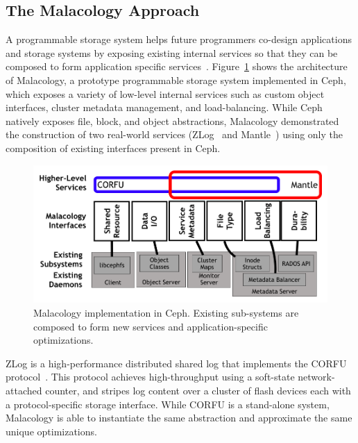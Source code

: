 \subsection{The Malacology Approach}


A programmable storage system helps future programmers co-design applications
and storage systems by exposing existing internal services so that 
they can be composed to form application specific
services~\cite{sevilla:eurosys17}.
Figure~\ref{fig:malacology} shows the architecture of Malacology, a prototype programmable storage system
implemented in Ceph, which exposes a variety of low-level internal services
such as custom object interfaces, cluster metadata management, and
load-balancing. While Ceph natively exposes file, block, and object
abstractions, Malacology demonstrated the construction of two real-world
services (ZLog~\cite{watkins:ucsc-soe-16-12} and Mantle~\cite{sevilla:sc15-mantle}) using only the composition of existing interfaces present in Ceph.

\begin{figure}[t]
\centering
\includegraphics[width=1.0\linewidth]{implementation-overview.png}
\caption{Malacology implementation in Ceph. Existing sub-systems are composed
    to form new services and application-specific optimizations.}
\label{fig:malacology}
\end{figure}

ZLog is a high-performance distributed shared
log that implements the CORFU protocol~\cite{balakrishnan:nsdi12}.
This protocol achieves high-throughput using a soft-state network-attached
counter, and stripes log content over a cluster of flash devices each with a
protocol-specific storage interface. While CORFU is a stand-alone system,
Malacology is able to instantiate the same abstraction and approximate 
the same unique optimizations.

